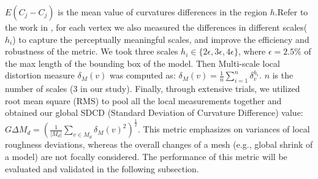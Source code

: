  $E(\hat{C_j}-C_j)$ is the mean value of curvatures differences in the region $h$.Refer to the work in \cite{Lavou__2011}, for each vertex we also measured the differences in different scales($h_i$) to capture the perceptually meaningful scales, and improve the efficiency and robustness of the metric. We took three scales $h_i\in\{2\epsilon, 3\epsilon, 4\epsilon\}$, where $\epsilon = 2.5\%$ of the max length of the bounding box of the model.  Then Multi-scale local distortion measure $\delta_M(v)$ was computed as: $\delta_M(v) = \frac{1}{n}\sum_{i=1}^n{\delta}_v^{h_i}$. $n$ is the number of scales (3 in our study). Finally, through extensive trials, we utilized root mean square (RMS) to pool all the local measurements together and obtained our global SDCD (Standard Deviation of Curvature Difference) value: $G\Delta M_d=(\frac{1}{|M_d|}\sum_{v\in M_d }{ \delta_M(v)^2})^\frac{1}{2}$. This metric emphasizes on variances of local roughness deviations, whereas the overall changes of a mesh (e.g., global shrink of a model) are not focally considered. The performance of this metric will be evaluated and validated in the following subsection.\\
